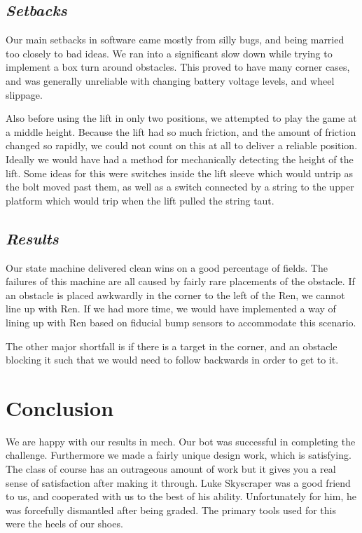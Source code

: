 \documentclass[]{article}
\begin{document}
\subsection*{\textit{Setbacks}}
Our main setbacks in software came mostly from silly bugs, and being married too closely to bad ideas. We ran into a significant slow down while trying to implement a box turn around obstacles. This proved to have many corner cases, and was generally unreliable with changing battery voltage levels, and wheel slippage.

Also before using the lift in only two positions, we attempted to play the game at a middle height. Because the lift had so much friction, and the amount of friction changed so rapidly, we could not count on this at all to deliver a reliable position. Ideally we would have had a method for mechanically detecting the height of the lift. Some ideas for this were switches inside the lift sleeve which would untrip as the bolt moved past them, as well as a switch connected by a string to the upper platform which would trip when the lift pulled the string taut.

\subsection*{\textit{Results}}

Our state machine delivered clean wins on a good percentage of fields. The failures of this machine are all caused by fairly rare placements of the obstacle. If an obstacle is placed awkwardly in the corner to the left of the Ren, we cannot line up with Ren. If we had more time, we would have implemented a way of lining up with Ren based on fiducial bump sensors to accommodate this scenario.

The other major shortfall is if there is a target in the corner, and an obstacle blocking it such that we would need to follow backwards in order to get to it.

\section*{Conclusion}

We are happy with our results in mech. Our bot was successful in completing the challenge. Furthermore we made a fairly unique design work, which is satisfying. The class of course has an outrageous amount of work but it gives you a real sense of satisfaction after making it through. Luke Skyscraper was a good friend to us, and cooperated with us to the best of his ability. Unfortunately for him, he was forcefully dismantled after being graded. The primary tools used for this were the heels of our shoes.
\end{document}
